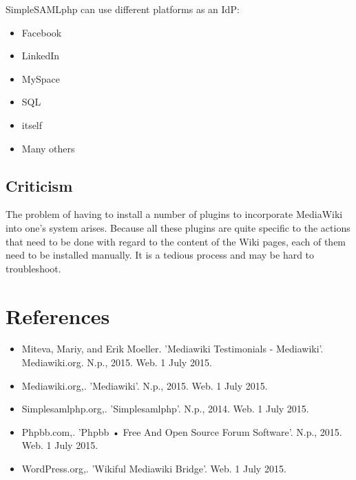 \documentclass[11pt,a4paper,titlepage]{article}
\begin{document}
SimpleSAMLphp can use different platforms as an IdP:
\begin{itemize}	
		
			  \item Facebook
			  \item LinkedIn
			  \item MySpace
			  \item SQL
			  \item itself
			  \item Many others
\end{itemize}

\subsection{Criticism}
The problem of having to install a number of plugins to incorporate MediaWiki into one's system arises. Because all these plugins are quite specific to the actions that need to be done with regard to the content of the Wiki pages, each of them need to be installed manually. It is a tedious process and may be hard to troubleshoot.

\section{References}
\begin{itemize}	
		
			  \item Miteva, Mariy, and Erik Moeller. 'Mediawiki Testimonials - Mediawiki'. Mediawiki.org. N.p., 2015. Web. 1 July 2015.
			  \item Mediawiki.org,. 'Mediawiki'. N.p., 2015. Web. 1 July 2015.
			  \item Simplesamlphp.org,. 'Simplesamlphp'. N.p., 2014. Web. 1 July 2015.
			  \item Phpbb.com,. 'Phpbb • Free And Open Source Forum Software'. N.p., 2015. Web. 1 July 2015.
			  \item WordPress.org,. 'Wikiful Mediawiki Bridge'. Web. 1 July 2015.
\end{itemize}
\end{document}
